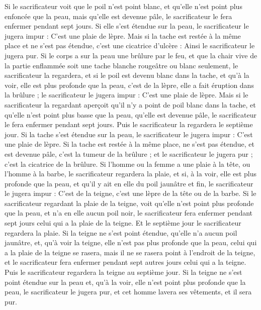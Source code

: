 \begin{multicols}{2}
Si le sacrificateur voit que le poil n’est point blanc, et qu'elle n’est point plus enfoncée  que la peau, mais qu'elle est devenue pâle, le sacrificateur le fera enfermer pendant sept jours.
Si elle s'est étendue sur la peau, le sacrificateur le jugera impur : C'est une plaie de lèpre.
Mais si la tache est restée à la même place et ne s’est pas étendue, c'est une cicatrice d'ulcère : Ainsi le sacrificateur le jugera pur.
Si le corps a sur la peau une brûlure par le feu, et que la chair vive de la partie enflammée soit une tache blanche rougeâtre ou blanc seulement, le sacrificateur la regardera,
et si le poil est devenu blanc dans la tache, et qu'à la voir, elle est plus profonde que la peau, c'est de la lèpre, elle a fait éruption dans la brûlure ; le sacrificateur le jugera impur : C'est une plaie de lèpre.
Mais si le sacrificateur la regardant aperçoit qu'il n'y a point de poil blanc dans la tache, et qu'elle n'est point plus basse que la peau, qu'elle est devenue pâle, le sacrificateur le fera enfermer pendant sept jours.
Puis le sacrificateur la regardera le septième jour. Si la tache s’est étendue sur la peau, le sacrificateur le jugera impur : C'est une plaie de lèpre.
Si la tache est restée à la même place, ne s’est pas étendue, et est devenue pâle, c'est la tumeur de la brûlure ; et le sacrificateur le jugera pur ; c'est la cicatrice de la brûlure.
Si l'homme ou la femme a une plaie à la tête, ou l'homme à la barbe,
le sacrificateur regardera la plaie, et si, à la voir, elle est plus profonde que la peau, et qu’il y ait en elle du poil jaunâtre et fin, le sacrificateur le jugera impur : C'est de la teigne, c'est une lèpre de la tête ou de la barbe.
Si le sacrificateur regardant la plaie de la teigne, voit qu’elle n'est point plus profonde que la peau, et n'a en elle aucun poil noir, le sacrificateur fera enfermer pendant sept jours celui qui a la plaie de la teigne.
Et le septième jour le sacrificateur regardera la plaie. Si la teigne ne s'est point étendue, qu'elle n'a aucun poil jaunâtre, et, qu'à voir la teigne, elle n’est pas plus profonde que la peau,
celui qui a la plaie de la teigne se rasera, mais il ne se rasera point à l'endroit de la teigne, et le sacrificateur fera enfermer pendant sept autres jours celui qui a la teigne.
Puis le sacrificateur regardera la teigne au septième jour. Si la teigne ne s'est point étendue sur la peau et, qu'à la voir, elle n'est point plus profonde que la peau, le sacrificateur le jugera pur, et cet homme lavera ses vêtements, et il sera pur.

\end{multicols}
